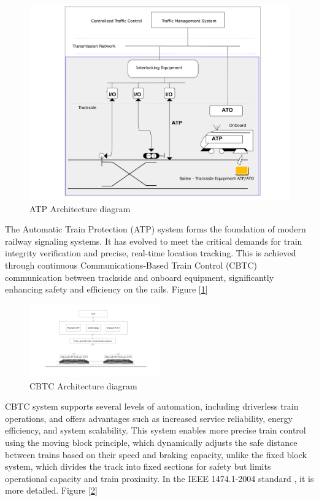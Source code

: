 \documentclass[conference]{IEEEtran}
\begin{document}
\begin{figure}[ht]
    \centering
    \centerline{\includegraphics[scale=0.20, angle=0]{Imagenes_general/ATP_Architecture_Metro_Quito_1.pdf}}
    \caption{ATP Architecture diagram}
    \label{ATP Architecture diagram}
\end{figure}

The Automatic Train Protection (ATP) system forms the foundation of modern railway signaling systems. It has evolved to meet the critical demands for train integrity verification and precise, real-time location tracking. This is achieved through continuous Communications-Based Train Control (CBTC) communication between trackside and onboard equipment, significantly enhancing safety and efficiency on the rails. Figure [\ref{ATP Architecture diagram}]

\begin{figure}[ht]
    \centering
    \centerline{\includegraphics[width=0.5\textwidth, scale=0.90]{Imagenes_general/esquema_general_arquitectura_CBTC_1.pdf}}
    \caption{CBTC Architecture diagram}
    \label{CBTC Architecture diagram}
\end{figure}

CBTC system supports several levels of automation, including driverless train operations, and offers advantages such as increased service reliability, energy efficiency, and system scalability. This system enables more precise train control using the moving block principle, which dynamically adjusts the safe distance between trains based on their speed and braking capacity, unlike the fixed block system, which divides the track into fixed sections for safety but limits operational capacity and train proximity. In the IEEE 1474.1-2004 standard \cite{b1}, it is more detailed. Figure [\ref{CBTC Architecture diagram}]
\end{document}
